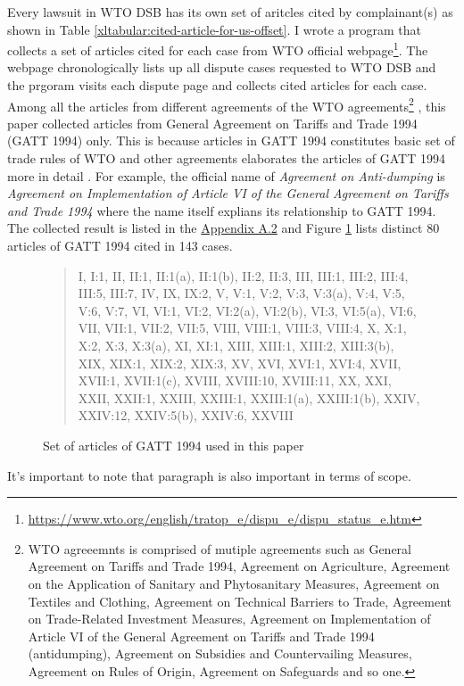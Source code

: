Every lawsuit in WTO DSB 
has its own set of aritcles cited by complainant(s)
as shown in Table 
\ref{xltabular:cited-article-for-us-offset}. 
I wrote a program that collects a set of articles cited for 
each case from WTO official webpage\footnote{\url{https://www.wto.org/english/tratop_e/dispu_e/dispu_status_e.htm}}. 
The webpage chronologically lists up all dispute cases
requested to WTO DSB and the prgoram visits each dispute page 
and collects cited articles for each case. Among all the articles from different agreements
of the WTO agreements\footnote{
    WTO agreeemnts is comprised of mutiple agreements such as
    General Agreement on Tariffs and Trade 1994,
    Agreement on Agriculture,
    Agreement on the Application of Sanitary and Phytosanitary Measures,
    Agreement on Textiles and Clothing,
    Agreement on Technical Barriers to Trade,
    Agreement on Trade-Related Investment Measures,
    Agreement on Implementation of Article VI of the General Agreement on Tariffs and Trade 1994 (antidumping),
    Agreement on Subsidies and Countervailing Measures,
    Agreement on Rules of Origin,
    Agreement on Safeguards and so one.
    } ,
this paper collected articles from General Agreement on Tariffs and Trade 1994 (GATT 1994) only. 
This is because articles in GATT 1994 constitutes basic set of trade rules of WTO and other agreements 
elaborates the articles of GATT 1994 more in detail \citep{world1999wto}. For example, the official name of \textit{Agreement on Anti-dumping}
is \textit{Agreement on Implementation of Article VI of the General Agreement on Tariffs and Trade 1994}
where the name itself explians its relationship to GATT 1994.
The collected result is listed in the \hyperref[sub:cited-articles-table]{Appendix A.2} and Figure \ref{fig:set-of-articles-used} 
lists distinct 80 articles of GATT 1994 cited in 143 cases. 

\begin{figure}[h]
    \begin{quote}
    I, 
    I:1, 
    II, 
    II:1, 
    II:1(a), 
    II:1(b), 
    II:2, 
    II:3, 
    III, 
    III:1, 
    III:2, 
    III:4, 
    III:5, 
    III:7, 
    IV, 
    IX, 
    IX:2, 
    V, 
    V:1, 
    V:2, 
    V:3, 
    V:3(a), 
    V:4, 
    V:5, 
    V:6, 
    V:7, 
    VI, 
    VI:1, 
    VI:2, 
    VI:2(a), 
    VI:2(b), 
    VI:3, 
    VI:5(a), 
    VI:6, 
    VII, 
    VII:1, 
    VII:2, 
    VII:5, 
    VIII, 
    VIII:1, 
    VIII:3, 
    VIII:4, 
    X, 
    X:1, 
    X:2, 
    X:3, 
    X:3(a), 
    XI, 
    XI:1, 
    XIII, 
    XIII:1, 
    XIII:2, 
    XIII:3(b), 
    XIX, 
    XIX:1, 
    XIX:2, 
    XIX:3, 
    XV, 
    XVI, 
    XVI:1, 
    XVI:4, 
    XVII, 
    XVII:1, 
    XVII:1(c), 
    XVIII, 
    XVIII:10, 
    XVIII:11, 
    XX, 
    XXI, 
    XXII, 
    XXII:1, 
    XXIII, 
    XXIII:1, 
    XXIII:1(a), 
    XXIII:1(b), 
    XXIV, 
    XXIV:12, 
    XXIV:5(b), 
    XXIV:6, 
    XXVIII
    \end{quote}
    \caption{Set of articles of GATT 1994 used in this paper}
    \label{fig:set-of-articles-used}
\end{figure}

It's important to note that paragraph is also important in terms of scope.

